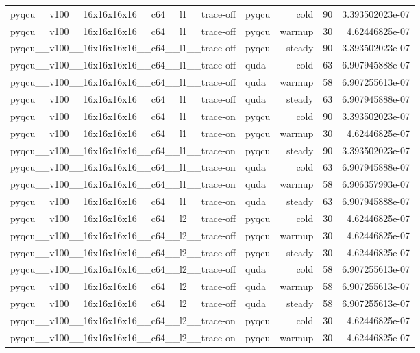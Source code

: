 \begin{table}[htbp]
\begin{tabular}{@{}llrrr@{}}
pyqcu\_\_v100\_\_16x16x16x16\_\_c64\_\_l1\_\_trace-off & pyqcu & cold & 90 & 3.393502023e-07 \\
pyqcu\_\_v100\_\_16x16x16x16\_\_c64\_\_l1\_\_trace-off & pyqcu & warmup & 30 & 4.62446825e-07 \\
pyqcu\_\_v100\_\_16x16x16x16\_\_c64\_\_l1\_\_trace-off & pyqcu & steady & 90 & 3.393502023e-07 \\
pyqcu\_\_v100\_\_16x16x16x16\_\_c64\_\_l1\_\_trace-off & quda & cold & 63 & 6.907945888e-07 \\
pyqcu\_\_v100\_\_16x16x16x16\_\_c64\_\_l1\_\_trace-off & quda & warmup & 58 & 6.907255613e-07 \\
pyqcu\_\_v100\_\_16x16x16x16\_\_c64\_\_l1\_\_trace-off & quda & steady & 63 & 6.907945888e-07 \\
pyqcu\_\_v100\_\_16x16x16x16\_\_c64\_\_l1\_\_trace-on & pyqcu & cold & 90 & 3.393502023e-07 \\
pyqcu\_\_v100\_\_16x16x16x16\_\_c64\_\_l1\_\_trace-on & pyqcu & warmup & 30 & 4.62446825e-07 \\
pyqcu\_\_v100\_\_16x16x16x16\_\_c64\_\_l1\_\_trace-on & pyqcu & steady & 90 & 3.393502023e-07 \\
pyqcu\_\_v100\_\_16x16x16x16\_\_c64\_\_l1\_\_trace-on & quda & cold & 63 & 6.907945888e-07 \\
pyqcu\_\_v100\_\_16x16x16x16\_\_c64\_\_l1\_\_trace-on & quda & warmup & 58 & 6.906357993e-07 \\
pyqcu\_\_v100\_\_16x16x16x16\_\_c64\_\_l1\_\_trace-on & quda & steady & 63 & 6.907945888e-07 \\
pyqcu\_\_v100\_\_16x16x16x16\_\_c64\_\_l2\_\_trace-off & pyqcu & cold & 30 & 4.62446825e-07 \\
pyqcu\_\_v100\_\_16x16x16x16\_\_c64\_\_l2\_\_trace-off & pyqcu & warmup & 30 & 4.62446825e-07 \\
pyqcu\_\_v100\_\_16x16x16x16\_\_c64\_\_l2\_\_trace-off & pyqcu & steady & 30 & 4.62446825e-07 \\
pyqcu\_\_v100\_\_16x16x16x16\_\_c64\_\_l2\_\_trace-off & quda & cold & 58 & 6.907255613e-07 \\
pyqcu\_\_v100\_\_16x16x16x16\_\_c64\_\_l2\_\_trace-off & quda & warmup & 58 & 6.907255613e-07 \\
pyqcu\_\_v100\_\_16x16x16x16\_\_c64\_\_l2\_\_trace-off & quda & steady & 58 & 6.907255613e-07 \\
pyqcu\_\_v100\_\_16x16x16x16\_\_c64\_\_l2\_\_trace-on & pyqcu & cold & 30 & 4.62446825e-07 \\
pyqcu\_\_v100\_\_16x16x16x16\_\_c64\_\_l2\_\_trace-on & pyqcu & warmup & 30 & 4.62446825e-07 \\

\end{tabular}
\end{table}
